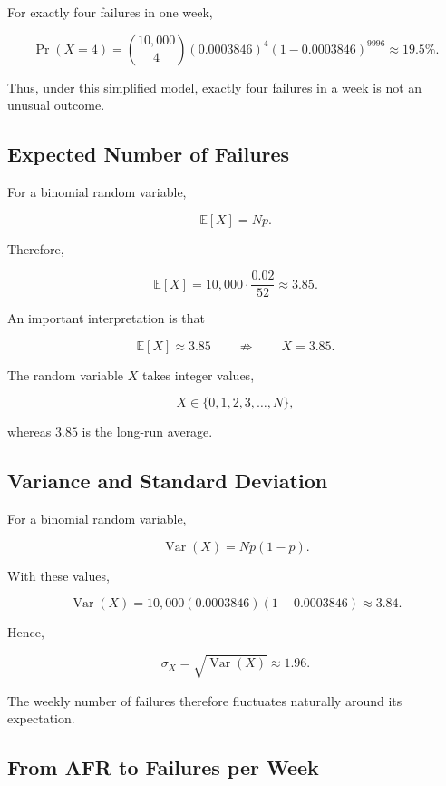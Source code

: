 \documentclass[11pt,a4paper,oneside]{book}
\begin{document}
For exactly four failures in one week,

\[
\Pr(X=4)
=
\binom{10{,}000}{4}
(0.0003846)^4
(1-0.0003846)^{9996}
\approx 19.5\%.
\]

Thus, under this simplified model, exactly four failures in a week is not an unusual outcome.

\subsection{Expected Number of Failures}

For a binomial random variable,

\begin{equation}
\mathbb{E}[X]=Np.
\label{eq:binomial-expectation}
\end{equation}

Therefore,

\[
\mathbb{E}[X]
=
10{,}000\cdot\frac{0.02}{52}
\approx 3.85.
\]

An important interpretation is that

\[
\mathbb{E}[X]\approx 3.85
\qquad\not\Rightarrow\qquad
X=3.85.
\]

The random variable \(X\) takes integer values,

\[
X\in\{0,1,2,3,\ldots,N\},
\]

whereas \(3.85\) is the long-run average.

\subsection{Variance and Standard Deviation}

For a binomial random variable,

\begin{equation}
\operatorname{Var}(X)=Np(1-p).
\label{eq:binomial-variance}
\end{equation}

With these values,

\[
\operatorname{Var}(X)
=
10{,}000(0.0003846)(1-0.0003846)
\approx 3.84.
\]

Hence,

\[
\sigma_X
=
\sqrt{\operatorname{Var}(X)}
\approx 1.96.
\]

The weekly number of failures therefore fluctuates naturally around its expectation.

\subsection{From AFR to Failures per Week}
\end{document}
